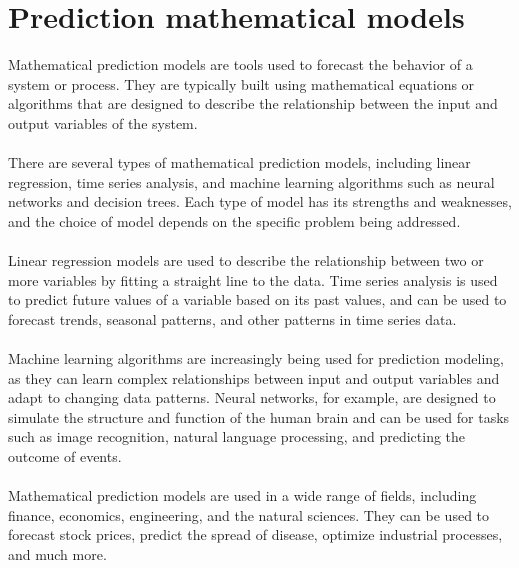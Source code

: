 \documentclass[12pt]{article}
\begin{document}
      \section{Prediction mathematical models}
      Mathematical prediction models are tools used to forecast the behavior of a system or process. They are typically built using mathematical equations or algorithms that are designed to describe the relationship between the input and output variables of the system.\\
    \\
    There are several types of mathematical prediction models, including linear regression, time series analysis, and machine learning algorithms such as neural networks and decision trees. Each type of model has its strengths and weaknesses, and the choice of model depends on the specific problem being addressed.\\
    \\
    Linear regression models are used to describe the relationship between two or more variables by fitting a straight line to the data. Time series analysis is used to predict future values of a variable based on its past values, and can be used to forecast trends, seasonal patterns, and other patterns in time series data.\\
    \\
    Machine learning algorithms are increasingly being used for prediction modeling, as they can learn complex relationships between input and output variables and adapt to changing data patterns. Neural networks, for example, are designed to simulate the structure and function of the human brain and can be used for tasks such as image recognition, natural language processing, and predicting the outcome of events.\\
    \\
    Mathematical prediction models are used in a wide range of fields, including finance, economics, engineering, and the natural sciences. They can be used to forecast stock prices, predict the spread of disease, optimize industrial processes, and much more.
\end{document}
